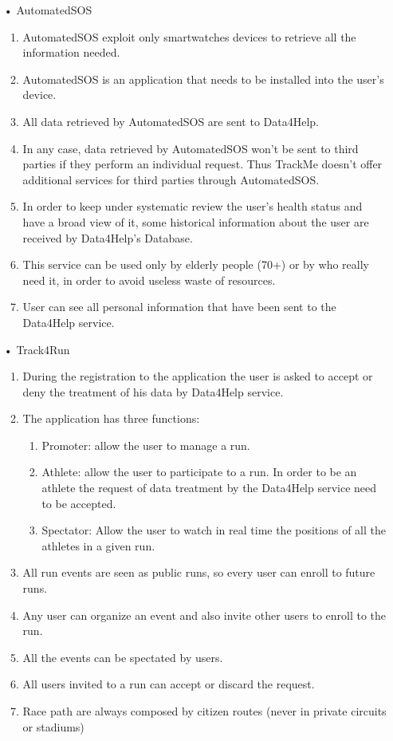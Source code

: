 \begin{enumerate}
\item[•] {\Large AutomatedSOS}
	\begin{enumerate}
	\item AutomatedSOS exploit only smartwatches devices to retrieve all the information needed.
	\item AutomatedSOS is an application that needs to be installed into the user's device.
	\item All data retrieved by AutomatedSOS are sent to Data4Help.
	\item In any case, data retrieved by AutomatedSOS won't be sent to third parties if they perform an individual request. Thus TrackMe doesn't offer additional services for third parties through AutomatedSOS.
	\item In order to keep under systematic review the user's health status and have a broad view of it, some historical information about the user are received by Data4Help's Database.
    \item This service can be used only by elderly people (70+) or by who really need it, in order to avoid useless waste of resources.
    \item User can see all personal information that have been sent to the Data4Help service. 
	\end{enumerate}
	
\item[•] {\Large Track4Run}
	\begin{enumerate}
	\item During the registration to the application the user is asked to accept or deny the treatment of his data by  Data4Help service.
	\item The application has three functions: 
	\begin{enumerate}
	\item Promoter: allow the user to manage a run.  
	\item Athlete: allow the user to participate to a run. In order to be an athlete the request of data treatment by the Data4Help service need to be accepted.
	\item Spectator: Allow the user to watch in real time the positions of all the athletes in a given run.
	\end{enumerate}
	\item All run events are seen as public runs, so every user can enroll to future runs.
	\item Any user can organize an event and also invite other users to enroll to the run.
    \item All the events can be spectated by users.
    \item All users invited to a run can accept or discard the request.
    \item Race path are always composed by citizen routes (never in private circuits or stadiums)
    \end{enumerate}
\end{enumerate}

